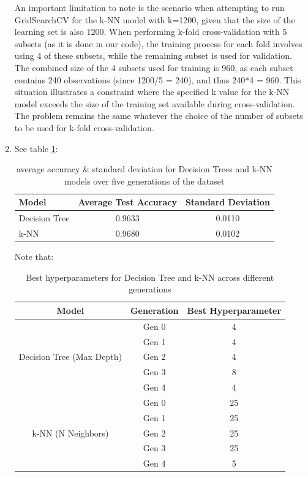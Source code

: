 \documentclass[acmconf,nonacm=true]{acmart}
\begin{document}
\begin{enumerate}
    An important limitation to note is the scenario when attempting to run GridSearchCV for the k-NN model with k=1200, given that the size of the learning set is also 1200. When performing k-fold cross-validation with 5 subsets (as it is done in our code), the training process for each fold involves using 4 of these subsets, while the remaining subset is used for validation. The combined size of the 4 subsets used for training is 960, as each subset contains 240 observations (since 1200/5 = 240), and thus 240*4 = 960. This situation illustrates a constraint where the specified k value for the k-NN model exceeds the size of the training set available during cross-validation. The problem remains the same whatever the choice of the number of subsets to be used for k-fold cross-validation.\\
    \item See table \ref{tab:avg_acc_std_tuning}:
    \begin{table}[H]
        \centering
        \begin{tabular}{|l|c|c|}
            \hline
            \textbf{Model} & \textbf{Average Test Accuracy} & \textbf{Standard Deviation} \\
            \hline
            Decision Tree & 0.9633 & 0.0110 \\
            k-NN & 0.9680 & 0.0102 \\
            \hline
        \end{tabular}
        \caption{average accuracy \& standard deviation for Decision Trees and k-NN models over five generations of the dataset}
        \label{tab:avg_acc_std_tuning}
    \end{table}

    Note that:

    \begin{table}[h]
        \centering
        \begin{tabular}{|c|c|c|}
        \hline
        \textbf{Model} & \textbf{Generation} & \textbf{Best Hyperparameter} \\
        \hline
        \multirow{5}{*}{Decision Tree (Max Depth)} & Gen 0 & 4 \\
         & Gen 1 & 4 \\
         & Gen 2 & 4 \\
         & Gen 3 & 8 \\
         & Gen 4 & 4 \\
        \hline
        \multirow{5}{*}{k-NN (N Neighbors)} & Gen 0 & 25 \\
         & Gen 1 & 25 \\
         & Gen 2 & 25 \\
         & Gen 3 & 25 \\
         & Gen 4 & 5 \\
        \hline
        \end{tabular}
        \caption{Best hyperparameters for Decision Tree and k-NN across different generations}
        \label{tab:hyperparameters}
    \end{table}


\end{enumerate}
\end{document}
